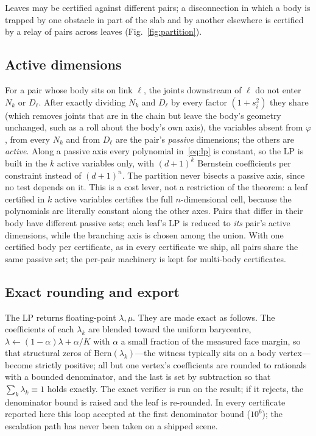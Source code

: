 \documentclass[10pt,twocolumn,letterpaper]{article}
\newcommand{\Bern}{\mathrm{Bern}}
\newcommand{\vphi}{\varphi}
\newif\ifhl \hlfalse  %
\newcommand{\new}[1]{\ifhl{\color{blue!65!black}#1}\else#1\fi}
\begin{document}
Leaves may be certified against different pairs; a disconnection in which a body is trapped by one obstacle in part of the slab and by another elsewhere is certified by a relay of pairs across leaves (Fig.~\ref{fig:partition}).

\subsection{Active dimensions}\label{sec:active}
For a pair whose body sits on link $\ell$, the joints downstream of $\ell$ do not enter $N_k$ or $D_\ell$. After exactly dividing $N_k$ and $D_\ell$ by every factor $(1+s_i^2)$ they share (which removes joints that are in the chain but leave the body's geometry unchanged, such as a roll about the body's own axis), the variables absent from $\vphi$, from every $N_k$ and from $D_\ell$ are the pair's \emph{passive} dimensions; the others are \emph{active}. Along a passive axis every polynomial in~\eqref{eq:lp} is constant, so the LP is built in the $k$ active variables only, with $(d+1)^k$ Bernstein coefficients per constraint instead of $(d+1)^n$. The partition never bisects a passive axis, since no test depends on it. This is a cost lever, not a restriction of the theorem: a leaf certified in $k$ active variables certifies the full $n$-dimensional cell, because the polynomials are literally constant along the other axes. \new{Pairs that differ in their body have different passive sets; each leaf's LP is reduced to \emph{its} pair's active dimensions, while the branching axis is chosen among the union. With one certified body per certificate, as in every certificate we ship, all pairs share the same passive set; the per-pair machinery is kept for multi-body certificates.}

\subsection{Exact rounding and export}\label{sec:export}
The LP returns floating-point $\lambda,\mu$. They are made exact as follows. The coefficients of each $\lambda_k$ are blended toward the uniform barycentre, $\lambda\leftarrow(1-\alpha)\lambda+\alpha/K$ with $\alpha$ a small fraction of the measured face margin, so that structural zeros of $\Bern(\lambda_k)$---the witness typically sits on a body vertex---become strictly positive; all but one vertex's coefficients are rounded to rationals with a bounded denominator, and the last is set by subtraction so that $\sum_k\lambda_k\equiv1$ holds exactly. The exact verifier is run on the result; if it rejects, the denominator bound is raised and the leaf is re-rounded. In every certificate reported here this loop accepted at the first denominator bound ($10^6$); the escalation path has never been taken on a shipped scene.
\end{document}
